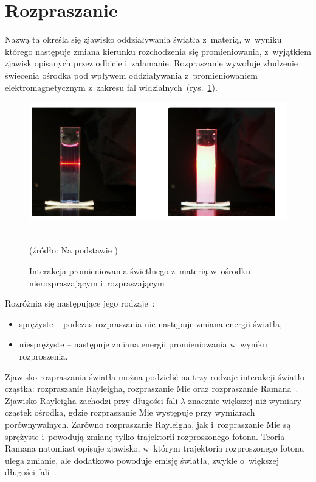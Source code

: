 \section{Rozpraszanie}
\label{sec:Rozpraszanie}

Nazwą tą określa się zjawisko oddziaływania światła z~materią, w~wyniku którego następuje zmiana kierunku rozchodzenia się promieniowania, z~wyjątkiem zjawisk opisanych 
przez odbicie i~załamanie. Rozpraszanie wywołuje złudzenie świecenia ośrodka pod wpływem oddziaływania z~promieniowaniem elektromagnetycznym z~zakresu fal widzialnych~(rys.~\ref{rys:scattering}). 
\begin{figure}[ht]
	\centerline{\includegraphics[scale = 0.45]{graphic/scattering.png}}
	\caption{Interakcja promieniowania świetlnego z~materią w~ośrodku nierozpraszającym i~rozpraszającym}
	~\\
	(źródło: Na podstawie \cite{Dwyer:2008})
	\label{rys:scattering}
\end{figure}

\noindent Rozróżnia się następujące jego rodzaje~\cite{Zee:1992}:
\begin{itemize}
	\item sprężyste – podczas rozpraszania nie następuje zmiana energii światła,
	\item niesprężyste – następuje zmiana energii promieniowania w~wyniku rozproszenia.
\end{itemize}

Zjawisko rozpraszania światła można podzielić na trzy rodzaje interakcji światło-cząstka: rozpraszanie Rayleigha, rozpraszanie Mie oraz rozpraszanie Ramana~\cite{Nui:2007}. 
Zjawisko Rayleigha zachodzi przy długości fali $\lambda$ znacznie większej niż wymiary cząstek ośrodka, gdzie rozpraszanie Mie 
występuje przy wymiarach porównywalnych. Zarówno rozpraszanie Rayleigha, jak i~rozpraszanie Mie są sprężyste i~powodują zmianę tylko trajektorii rozproszonego 
fotonu. Teoria Ramana natomiast opisuje zjawisko, w~którym trajektoria rozproszonego fotonu ulega zmianie, ale dodatkowo powoduje emisję światła, zwykle o~większej 
długości fali~\cite{Nui:2007}.

